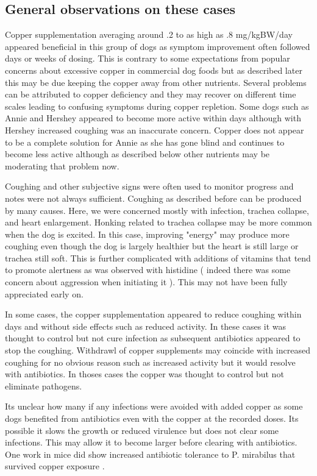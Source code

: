 \subsection{ General observations on these cases }


Copper supplementation averaging around .2 to as high 
as .8 mg/kgBW/day appeared beneficial in this group of
dogs as symptom improvement often followed days or weeks of dosing.
This is contrary to some expectations  from popular concerns
about excessive copper in commercial dog foods  but as described
later this may be due keeping the copper away from other nutrients.
Several problems can be attributed to copper deficiency and 
they may recover on different time scales leading to confusing
symptoms during copper repletion. Some dogs such as Annie and
Hershey appeared to become more active within days although
with Hershey increased coughing was an inaccurate concern.
Copper does not appear to be a complete solution for Annie
as she has gone blind and continues to become less active although
as described below other nutrients may be moderating that problem now.




Coughing and other subjective signs were often used
to monitor progress and notes were not always sufficient.
Coughing as described before can be produced by many
causes. Here, we were concerned mostly with infection,
trachea collapse, and heart enlargement. Honking
related to trachea collapse may be more common when the
dog is excited. In this case, improving "energy" may
produce more coughing even though the dog is largely
healthier but the heart is still large or trachea
still soft. This is further complicated with additions
of vitamins that tend to promote alertness as was 
observed with histidine ( indeed there was some concern
about aggression when initiating it ). This may not
have been fully appreciated early on.  

In some cases, the copper supplementation appeared to reduce coughing within 
days and without side effects such as reduced activity. In
these cases it was thought to control but not cure
infection as subsequent antibiotics appeared to stop the coughing.
Withdrawl of copper supplements
may coincide with increased coughing for no obvious reason
such as increased activity but it would resolve
with antibiotics. In thoses cases the copper was thought
to control but not eliminate pathogens.

Its unclear how many if any infections were avoided with
added copper as some dogs benefited from antibiotics even with
the copper at the recorded doses. Its possible it slows the growth
or reduced virulence but does not clear some infections.
This may allow it to become larger before clearing with antibiotics.
One work in mice did show increased antibiotic tolerance to
P. mirabilus that survived copper exposure
\cite{Huang_Lee_Wang_Copper_affects_virulence_2024}.


